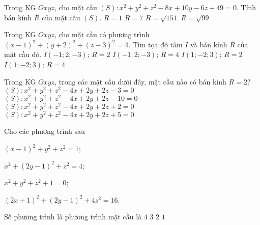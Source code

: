 \begin{ex}%
	Trong KG $Oxyz$, cho mặt cầu $(S)\colon x^2+y^2+z^2-8x+10y-6z+49=0$. Tính bán kính $R$ của mặt cầu $(S)$.
	\choice
	{\True $R=1$}
	{$R=7$}
	{$R=\sqrt{151}$}
	{$R=\sqrt{99}$}
\end{ex}
		
\begin{ex}%
	Trong KG $Oxyz$, cho mặt cầu có phương trình $(x-1)^2+(y+2)^2+(z-3)^2=4$. Tìm tọa độ tâm $I$ và bán kính $R$ của mặt cầu đó.
	\choice
	{$I(-1;2;-3)$; $R=2$}
	{$I(-1;2;-3)$; $R=4$}
	{\True $I(1;-2;3)$; $R=2$}
	{$I(1;-2;3)$; $R=4$}
\end{ex}		
		
\begin{ex}%
	Trong KG $Oxyz$, trong các mặt cầu dưới đây, mặt cầu nào có bán kính $R=2$?
	\choice
	{$(S)\colon x^2+y^2+z^2-4x+2y+2z-3=0$}
	{$(S)\colon x^2+y^2+z^2-4x+2y+2z-10=0$}
	{\True $(S)\colon x^2+y^2+z^2-4x+2y+2z+2=0$}
	{$(S)\colon x^2+y^2+z^2-4x+2y+2z+5=0$}
\end{ex}
		
\begin{ex}%
	Cho các phương trình sau
	\begin{listEX}[2]
		\item $\left(x-1\right)^2+y^2+z^2=1$;
		\item $x^2+\left(2y-1\right)^2+z^2=4$;
		\item $x^2+y^2+z^2+1=0$;
		\item $\left(2x+1\right)^2+\left(2y-1\right)^2+4z^2=16$.
	\end{listEX}
	Số phương trình là phương trình mặt cầu là
	\choice
	{$4$}
	{$3$}
	{\True $2$}
	{$1$}
\end{ex}
		
